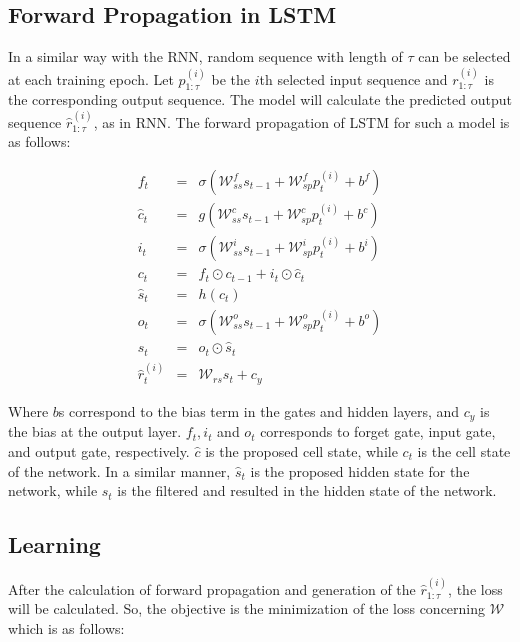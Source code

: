 \subsection{Forward Propagation in LSTM}

In a similar way with the RNN, random sequence with length of $\tau$ can be selected at each training epoch. Let $p_{1:\tau}^{(i)}$ be the $i$th selected input sequence and $r_{1:\tau}^{(i)}$ is the corresponding output sequence. The model will calculate the predicted output sequence $\hat{r}_{1:\tau}^{(i)}$, as in RNN.
The forward propagation of LSTM for such a model is as follows:

\begin{eqnarray}
    f_t & = & \sigma\left(\mathcal{W}^{f}_{ss} s_{t-1} + \mathcal{W}_{sp}^{f} p^{(i)}_t + b^f \right) \\
    \hat{c}_t & = & g\left(\mathcal{W}^{c}_{ss} s_{t-1} + \mathcal{W}_{sp}^{c} p^{(i)}_t + b^c \right) \\
    i_t & = & \sigma\left(\mathcal{W}^{i}_{ss} s_{t-1} + \mathcal{W}_{sp}^{i} p^{(i)}_t + b^i \right) \\
    c_t & = & f_t \odot c_{t-1} + i_t \odot \hat{c}_t \\
    \hat{s}_t & = & h\left(c_{t}\right) \\
    o_t & = & \sigma\left(\mathcal{W}^{o}_{ss} s_{t-1} + \mathcal{W}_{sp}^{o} p^{(i)}_t + b^o \right) \\
    s_t & = & o_t \odot \hat{s}_t \\
    \hat{r}^{(i)}_{t} & = & \mathcal{W}_{rs}s_t + c_y \label{eq:lstm-result}
\end{eqnarray}

Where $b$s correspond to the bias term in the gates and hidden layers, and $c_y$ is the bias at the output layer. $f_t, i_t$ and $o_t$ corresponds to forget gate, input gate, and output gate, respectively. $\hat{c}$ is the proposed cell state, while $c_t$ is the cell state of the network. In a similar manner, $\hat{s}_t$ is the proposed hidden state for the network, while $s_t$ is the filtered and resulted in the hidden state of the network. 

\subsection{Learning}

After the calculation of forward propagation and generation of the $\hat{r}^{(i)}_{1:\tau}$, the loss will be calculated. So, the objective is the minimization of the loss concerning {\boldmath$\mathcal{W}$} which is as follows:

